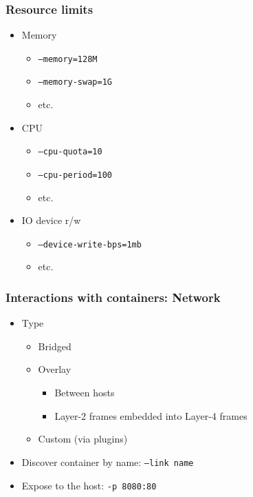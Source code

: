 \documentclass[xetex,mathserif,serif]{beamer}
\begin{document}
  \begin{frame}
    \frametitle{Resource limits}
    \begin{itemize}
      \item Memory
        \begin{itemize}
          \item \texttt{--memory=128M}
          \item \texttt{--memory-swap=1G}
          \item etc.
        \end{itemize}
      \item CPU
        \begin{itemize}
          \item \texttt{--cpu-quota=10}
          \item \texttt{--cpu-period=100}
          \item etc.
        \end{itemize}
      \item IO device r/w
        \begin{itemize}
          \item \texttt{--device-write-bps=1mb}
          \item etc.
        \end{itemize}
    \end{itemize}
  \end{frame}
  \begin{frame}
    \frametitle{Interactions with containers: Network}
    \begin{itemize}
      \item Type
        \begin{itemize}
          \item Bridged
          \item Overlay
            \begin{itemize}
              \item Between hosts
              \item Layer-2 frames embedded into Layer-4 frames
            \end{itemize}
          \item Custom (via plugins)
        \end{itemize}
      \item Discover container by name: \texttt{--link name}
      \item Expose to the host: \texttt{-p 8080:80}
    \end{itemize}
  \end{frame}
\end{document}
